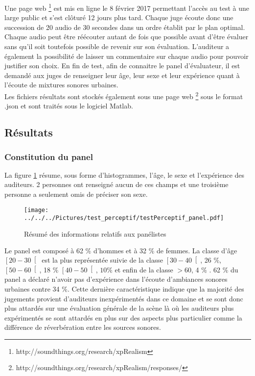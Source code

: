 Une page web \footnote{http://soundthings.org/research/xpRealism} est mis en ligne le 8 février 2017 permettant l'accès au test à une large public et s'est clôturé 12 jours plus tard. Chaque juge écoute donc une succession de 20 audio de 30 secondes dans un ordre établit par le plan optimal. Chaque audio peut être réécouter autant de fois que possible avant d'être évaluer sans qu'il soit toutefois possible de revenir sur son évaluation. L'auditeur a également la possibilité de laisser un commentaire sur chaque audio pour pouvoir justifier son choix. En fin de test, afin de connaitre le panel d'évaluateur, il est demandé aux juges de renseigner leur âge, leur sexe et leur expérience quant à l'écoute de mixtures sonores urbaines.\\

Les fichiers résultats sont stockés également sous une page web \footnote{http://soundthings.org/research/xpRealism/responses/} sous le format .json et sont traités sous le logiciel Matlab.\\

\subsection{Résultats}
\subsubsection{Constitution du panel}

La figure \ref{fig:panelTest} résume, sous forme d'histogrammes, l'âge, le sexe et l'expérience des auditeurs. 2 personnes ont renseigné aucun de ces champs et une troisième personne a seulement omis de préciser son sexe.\\

\begin{figure}[ht]
\centering
\texttt{[image: ../../../Pictures/test\_perceptif/testPerceptif\_panel.pdf]}
\caption{Résumé des informations relatifs aux panélistes}
\label{fig:panelTest}
\end{figure}

Le panel est composé à 62 $\%$ d'hommes et à 32 $\%$ de femmes. La classe d'âge $\left[20-30\right[$ est la plus représentée suivie de la classe $\left[30-40\right[$, 26 $\%$, $\left[50-60\right[$,  18 $\%$ $\left[40-50\right[$, $10\%$ et enfin de la classe $>60$,  4 $\%$ . 62 $\%$ du panel a déclaré n'avoir pas d'expérience dans l'écoute d'ambiances sonores urbaines contre 34 $\%$. Cette dernière caractéristique indique que la majorité des jugements provient d'auditeurs inexpérimentés dans ce domaine et se sont donc plus attardés sur une évaluation générale de la scène là où les auditeurs plus expérimentés se sont attardés en plus sur des aspects plus particulier comme la différence de réverbération entre les sources sonores. \\

